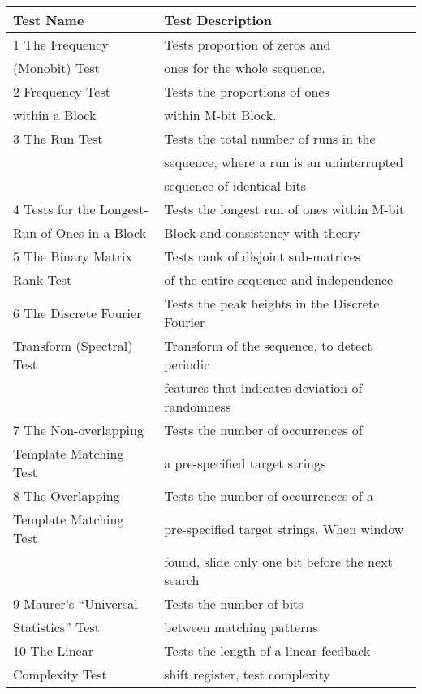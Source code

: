\begin{tabular}{|l|l|}
\hline

{\bf Test Name}& {\bf Test Description} \\

\hline
1 The Frequency & Tests proportion of zeros and \\
(Monobit) Test & ones for the whole sequence.\\
\hline
2 Frequency Test  & Tests the proportions of ones\\
within a Block    & within M-bit Block.\\
\hline
3 The Run Test & Tests the total number of runs in the \\
               & sequence, where a run is an uninterrupted \\
               & sequence of identical bits \\
\hline
4 Tests for the Longest- & Tests the longest run of ones within M-bit \\
Run-of-Ones in a Block & Block and consistency with theory \\
\hline
5 The Binary Matrix & Tests rank of disjoint sub-matrices \\
Rank Test & of the entire sequence and independence \\
\hline
6 The Discrete Fourier & Tests the peak heights in the Discrete Fourier  \\
Transform (Spectral) Test & Transform of the sequence, to detect periodic \\
                       & features that indicates deviation of randomness \\
\hline
7 The Non-overlapping & Tests the number of occurrences of\\
Template Matching Test & a pre-specified target strings \\
\hline
8 The Overlapping & Tests the number of occurrences of a \\
Template Matching Test & pre-specified target strings. When window \\
                   & found, slide only one bit before the next search \\
\hline
9 Maurer’s “Universal & Tests the number of bits \\
Statistics” Test & between matching patterns \\
\hline
10 The Linear & Tests the length of a linear feedback \\
Complexity Test & shift register, test complexity \\

\end{tabular}
